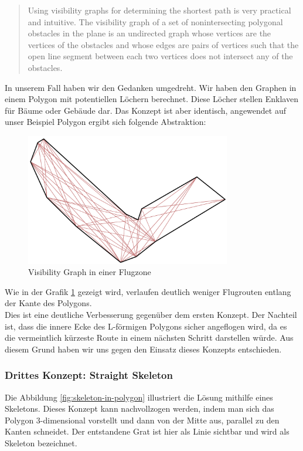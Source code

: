 \blockquote{Using visibility graphs for determining the shortest path is very practical and intuitive. The visibility graph of a set of nonintersecting polygonal obstacles in the plane is an undirected graph whose vertices are the vertices of the obstacles and whose edges are pairs of vertices such that the open line segment between each two vertices does not intersect any of the obstacles.}
In unserem Fall haben wir den Gedanken umgedreht. Wir haben den Graphen in einem Polygon mit potentiellen Löchern berechnet. Diese Löcher stellen Enklaven für Bäume oder Gebäude dar. Das Konzept ist aber identisch, angewendet auf unser Beispiel Polygon ergibt sich folgende Abstraktion:
\begin{figure}[h]
	\centering
	\includegraphics[width=0.8\textwidth]{images/routing/visibilityGraph.png}
	\caption{Visibility Graph in einer Flugzone}
	\label{fig:visibility-graph}
\end{figure}
Wie in der Grafik \ref{fig:visibility-graph} gezeigt wird, verlaufen deutlich weniger Flugrouten entlang der Kante des Polygons. \\
Dies ist eine deutliche Verbesserung gegenüber dem ersten Konzept. Der Nachteil ist, dass die innere Ecke des L-förmigen Polygons sicher angeflogen wird, da es die vermeintlich kürzeste Route in einem nächsten Schritt darstellen würde. Aus diesem Grund haben wir uns gegen den Einsatz dieses Konzepts entschieden.\\

\subsubsection{Drittes Konzept: Straight Skeleton}
Die Abbildung \ref{fig:skeleton-in-polygon} illustriert die Lösung mithilfe eines Skeletons. Dieses Konzept kann nachvollzogen werden, indem man sich das Polygon 3-dimensional vorstellt und dann  von der Mitte aus, parallel zu den Kanten schneidet. Der entstandene Grat ist hier als Linie sichtbar und wird als Skeleton bezeichnet.

